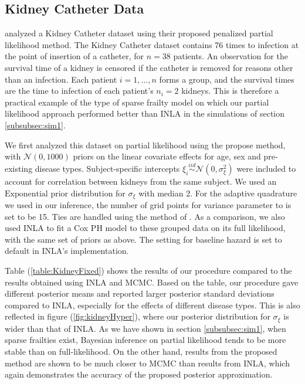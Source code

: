 \documentclass[ba]{imsart}
\begin{document}
\subsection{Kidney Catheter Data}\label{subsec:kidney}

\cite{freqPL} analyzed a Kidney Catheter dataset using their proposed penalized partial likelihood method. The Kidney Catheter dataset contains 76 times to infection at the point of insertion of a catheter, for $n = 38$ patients. An observation for the survival time of a kidney is censored if the catheter is removed for reasons other than an infection.  Each patient $i=1,\ldots,n$ forms a group, and the survival times are the time to infection of each patient's $n_{i} = 2$ kidneys. This is therefore a practical example of the type of sparse frailty model on which our partial likelihood approach performed better than INLA in the simulations of section \ref{subsubsec:sim1}.

We first analyzed this dataset on partial likelihood using the propose method, with $\mathcal{N}(0, 1000)$ priors on the linear covariate effects for age, sex and pre-existing disease types. Subject-specific intercepts $\xi_{i}\overset{iid}{\sim}\mathcal{N}(0,\sigma^{2}_{\xi})$ were included to account for correlation between kidneys from the same subject. We used an $\text{Exponential}$ prior distribution for $\sigma_{\xi}$ with median 2. For the adaptive quadrature we used in our inference, the number of grid points for variance parameter to is set to be 15. Ties are handled using the method of \cite{Breslow}.
As a comparison, we also used INLA to fit a Cox PH model to these grouped data on its full likelihood, with the same set of priors as above. The setting for baseline hazard is set to default in INLA's implementation.

Table (\ref{table:KidneyFixed}) shows the results of our procedure compared to the results obtained using INLA and MCMC. Based on the table, our procedure gave different posterior means and reported larger posterior standard deviations compared to INLA, especially for the effects of different disease types. This is also reflected in figure (\ref{fig:kidneyHyper}), where our posterior distribution for $\sigma_{\xi}$ is wider than that of INLA. As we have shown in section \ref{subsubsec:sim1}, when sparse frailties exist, Bayesian inference on partial likelihood tends to be more stable than on full-likelihood. On the other hand, results from the proposed method are shown to be much closer to MCMC than results from INLA, which again demonstrates the accuracy of the proposed posterior approximation.
\end{document}
